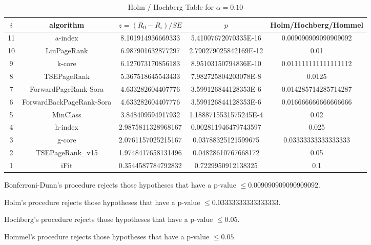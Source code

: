 \documentclass[a4paper,10pt]{article}
\begin{document}
\begin{landscape}
\begin{table}[!htp]
\centering\tiny
\caption{Holm / Hochberg Table for $\alpha=0.10$}
\begin{tabular}{ccccc}
$i$&algorithm&$z=(R_0 - R_i)/SE$&$p$&Holm/Hochberg/Hommel\\
\hline
11&a-index&8.101914936669333&5.41007672070335E-16&0.009090909090909092\\
10&LiuPageRank&6.987901632877297&2.790279025842169E-12&0.01\\
9&k-core&6.127073170856183&8.95103150794836E-10&0.011111111111111112\\
8&TSEPageRank&5.367518645543433&7.982725804203078E-8&0.0125\\
7&ForwardPageRank-Sora&4.633282604407776&3.599126844128353E-6&0.014285714285714287\\
6&ForwardBackPageRank-Sora&4.633282604407776&3.599126844128353E-6&0.016666666666666666\\
5&MinClass&3.848409594917932&1.1888715531575245E-4&0.02\\
4&h-index&2.9875811328968167&0.002811946479743597&0.025\\
3&g-core&2.0761157025215167&0.03788325121599675&0.03333333333333333\\
2&TSEPageRank_v15&1.9748417658131496&0.04828610767668172&0.05\\
1&iFit&0.3544587784792832&0.7229950912138325&0.1\\
\hline
\end{tabular}
\end{table}
Bonferroni-Dunn's procedure rejects those hypotheses that have a p-value $\le0.009090909090909092$.


Holm's procedure rejects those hypotheses that have a p-value $\le0.03333333333333333$.


Hochberg's procedure rejects those hypotheses that have a p-value $\le0.05$.


Hommel's procedure rejects those hypotheses that have a p-value $\le0.05$.



\end{landscape}
\end{document}
